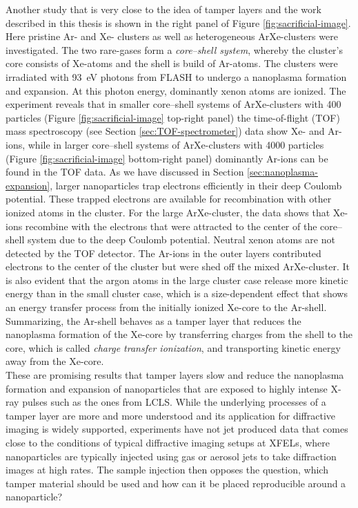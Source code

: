 Another study \citep{Hoener-2008-JPB} that is very close to the idea of tamper layers and the work described in this thesis is shown in the right panel of Figure \ref{fig:sacrificial-image}. Here pristine Ar- and Xe- clusters as well as heterogeneous ArXe-clusters were investigated. The two rare-gases form a \textit{core--shell system}, whereby the cluster's core consists of Xe-atoms and the shell is build of Ar-atoms. The clusters were irradiated with \SI{93}{\electronvolt} photons from FLASH to undergo a nanoplasma formation and expansion. At this photon energy, dominantly xenon atoms are ionized. The experiment reveals that in smaller core--shell systems of ArXe-clusters with \num{400} particles (Figure \ref{fig:sacrificial-image} top-right panel) the time-of-flight (TOF) mass spectroscopy (see Section \ref{sec:TOF-spectrometer}) data show Xe- and Ar-ions, while in larger core--shell systems of ArXe-clusters with \num{4000} particles (Figure \ref{fig:sacrificial-image} bottom-right panel) dominantly Ar-ions can be found in the TOF data. As we have discussed in Section \ref{sec:nanoplasma-expansion}, larger nanoparticles trap electrons efficiently in their deep Coulomb potential. These trapped electrons are available for recombination with other ionized atoms in the cluster. For the large ArXe-cluster, the data shows that Xe-ions recombine with the electrons that were attracted to the center of the core--shell system due to the deep Coulomb potential. Neutral xenon atoms are not detected by the TOF detector. The Ar-ions in the outer layers contributed electrons to the center of the cluster but were shed off the mixed ArXe-cluster. It is also evident that the argon atoms in the large cluster case release more kinetic energy than in the small cluster case, which is a size-dependent effect that shows an energy transfer process from the initially ionized Xe-core to the Ar-shell. Summarizing, the Ar-shell behaves as a tamper layer that reduces the nanoplasma formation of the Xe-core by transferring charges from the shell to the core, which is called \textit{charge transfer ionization}, and transporting kinetic energy away from the Xe-core.\\[1\baselineskip]
%
These are promising results that tamper layers slow and reduce the nanoplasma formation and expansion of nanoparticles that are exposed to highly intense X-ray pulses such as the ones from LCLS. While the underlying processes of a tamper layer are more and more understood and its application for diffractive imaging is widely supported, experiments have not jet produced data that comes close to the conditions of typical diffractive imaging setups at XFELs, where nanoparticles are typically injected using gas or aerosol jets to take diffraction images at high rates. The sample injection then opposes the question, which tamper material should be used and how can it be placed reproducible around a nanoparticle?
